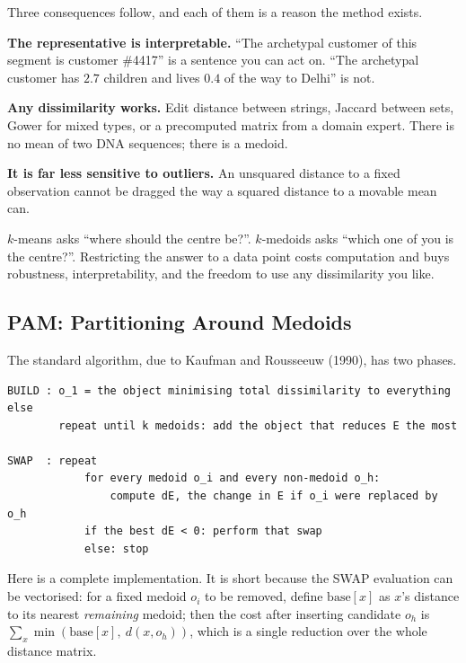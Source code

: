\documentclass[11pt]{article}
\begin{document}
Three consequences follow, and each of them is a reason the method exists.

\textbf{The representative is interpretable.} ``The archetypal customer of
this segment is customer \#4417'' is a sentence you can act on. ``The
archetypal customer has $2.7$ children and lives $0.4$ of the way to Delhi''
is not.

\textbf{Any dissimilarity works.} Edit distance between strings, Jaccard
between sets, Gower for mixed types, or a precomputed matrix from a domain
expert. There is no mean of two DNA sequences; there is a medoid.

\textbf{It is far less sensitive to outliers.} An unsquared distance to a
fixed observation cannot be dragged the way a squared distance to a movable
mean can.

\begin{keyidea}
$k$-means asks ``where should the centre be?''. $k$-medoids asks ``which one
of you is the centre?''. Restricting the answer to a data point costs
computation and buys robustness, interpretability, and the freedom to use any
dissimilarity you like.
\end{keyidea}

\subsection{PAM: Partitioning Around Medoids}

The standard algorithm, due to Kaufman and Rousseeuw (1990), has two phases.

\begin{lstlisting}
BUILD : o_1 = the object minimising total dissimilarity to everything else
        repeat until k medoids: add the object that reduces E the most

SWAP  : repeat
            for every medoid o_i and every non-medoid o_h:
                compute dE, the change in E if o_i were replaced by o_h
            if the best dE < 0: perform that swap
            else: stop
\end{lstlisting}

Here is a complete implementation. It is short because the SWAP evaluation can
be vectorised: for a fixed medoid $o_i$ to be removed, define
$\text{base}[x]$ as $x$'s distance to its nearest \emph{remaining} medoid;
then the cost after inserting candidate $o_h$ is
$\sum_x \min(\text{base}[x],\ d(x,o_h))$, which is a single reduction over the
whole distance matrix.
\end{document}
